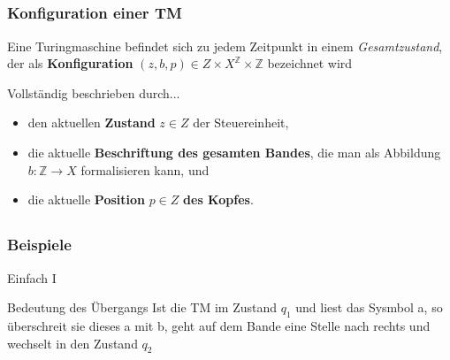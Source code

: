 \subsection*{}
\begin{frame}
  \frametitle{Konfiguration einer TM}
Eine Turingmaschine befindet sich zu jedem Zeitpunkt in einem \textit{Gesamtzustand}, der als \textbf{Konfiguration} $(z, b, p) \in Z \times X^\mathbb{Z} \times \mathbb{Z}$ bezeichnet wird
\begin{block}{Vollständig beschrieben durch...}
\begin{itemize}
  \pause
	\item den aktuellen \textbf{Zustand} $z \in Z$ der Steuereinheit,
	\pause
	\item die aktuelle \textbf{Beschriftung des gesamten Bandes}, die man als Abbildung $b: \mathbb{Z} \rightarrow X$ formalisieren kann, und
	\pause
	\item die aktuelle \textbf{Position} $p \in Z$ \textbf{des Kopfes}.
\end{itemize}
\end{block}
\end{frame}

\subsection*{}
\begin{frame}
  \frametitle{Beispiele}
\begin{block}{Einfach I}
\begin{figure}
	\centering


\end{figure}
\end{block}
\pause
 \begin{block}{Bedeutung des Übergangs}
 Ist die TM im Zustand $q_1$ und liest das Sysmbol a, so überschreit sie dieses a mit b, geht auf dem Bande eine Stelle nach rechts und wechselt in den Zustand $q_2$
\end{block}
\end{frame}

